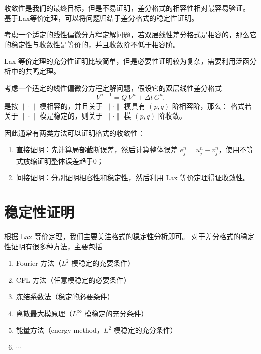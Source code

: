 收敛性是我们的最终目标，但是不易证明，差分格式的相容性相对最容易验证。
基于Lax等价定理，可以将问题归结于差分格式的稳定性证明。

\begin{theorem}
    考虑一个适定的线性偏微分方程定解问题，若双层线性差分格式是相容的，那么它的稳定性与收敛性是等价的，并且收敛阶不低于相容阶。
\end{theorem}

\begin{remark}
    Lax 等价定理的充分性证明比较简单，但是必要性证明较为复杂，需要利用泛函分析中的共鸣定理。
\end{remark}

\begin{theorem}[Lax 定理]
    考虑一个适定的线性偏微分方程定解问题，假设它的双层线性差分格式
    \[
        V^{n+1} = Q \,V^n +\Delta t \,G^n.
    \]
    是按 $\|\cdot\|$ 模相容的，并且关于 $\|\cdot\|$ 模具有 $(p,q)$ 阶相容阶，那么：
    格式若关于 $\|\cdot\|$ 模是稳定的，则关于 $\|\cdot\|$ 模 $(p,q)$ 阶收敛。
\end{theorem}

因此通常有两类方法可以证明格式的收敛性：
\begin{enumerate}
    \item 直接证明：先计算局部截断误差，然后计算整体误差 $e_j^n = u_j^n - v_j^n$，使用不等式放缩证明整体误差趋于0；
    \item 间接证明：分别证明相容性和稳定性，然后利用 Lax 等价定理得证收敛性。
\end{enumerate}

\section{稳定性证明}

根据 Lax 等价定理，我们主要关注格式的稳定性分析即可。
对于差分格式的稳定性证明有很多种方法，主要包括
\begin{enumerate}
    \item Fourier 方法（$L^2$ 模稳定的充要条件）
    \item CFL 方法（任意模稳定的必要条件）
    \item 冻结系数法（稳定的必要条件）
    \item 离散最大模原理（$L^\infty$ 模稳定的充分条件）
    \item 能量方法（energy method，$L^2$ 模稳定的充分条件）
    \item[] $\cdots$
\end{enumerate}


